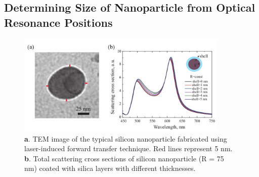     \subsection{Determining Size of Nanoparticle from Optical Resonance Positions}

        \begin{figure}[!ht]
                \begin{center}
                    \includegraphics[width=0.9\textwidth]{figs/results/char/CoreShell.jpg}
                \end{center}
                \caption{\textbf{a}. TEM image of the typical silicon nanoparticle fabricated using laser-induced
                            forward transfer technique. Red lines represent 5 nm. \textbf{b}. Total scattering cross sections of
                            silicon nanoparticle (R = 75 nm) coated with silica layers with different thicknesses.}
                \label{fig:CoreShell}
        \end{figure}

